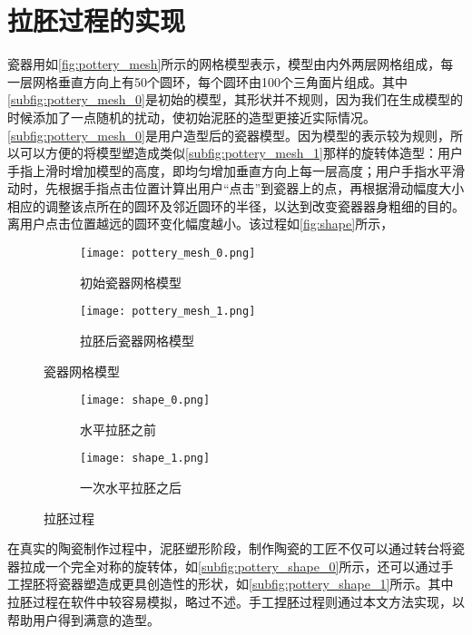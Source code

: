 \section{拉胚过程的实现}

瓷器用如\autoref{fig:pottery_mesh}所示的网格模型表示，模型由内外两层网格组成，每一层网格垂直方向上有50个圆环，每个圆环由100个三角面片组成。其中\autoref{subfig:pottery_mesh_0}是初始的模型，其形状并不规则，因为我们在生成模型的时候添加了一点随机的扰动，使初始泥胚的造型更接近实际情况。\autoref{subfig:pottery_mesh_0}是用户造型后的瓷器模型。因为模型的表示较为规则，所以可以方便的将模型塑造成类似\autoref{subfig:pottery_mesh_1}那样的旋转体造型：用户手指上滑时增加模型的高度，即均匀增加垂直方向上每一层高度；用户手指水平滑动时，先根据手指点击位置计算出用户“点击”到瓷器上的点，再根据滑动幅度大小相应的调整该点所在的圆环及邻近圆环的半径，以达到改变瓷器器身粗细的目的。离用户点击位置越远的圆环变化幅度越小。该过程如\autoref{fig:shape}所示，

\begin{figure}[htbp]
	\centering
	\begin{subfigure}[b]{.4\textwidth}
		\centering
	    \texttt{[image: pottery\_mesh\_0.png]}
		\caption{初始瓷器网格模型}\label{subfig:pottery_mesh_0}
	\end{subfigure}
	\begin{subfigure}[b]{.4\textwidth}
		\centering
		\texttt{[image: pottery\_mesh\_1.png]}
		\caption{拉胚后瓷器网格模型}\label{subfig:pottery_mesh_1}
	\end{subfigure}
	\caption{瓷器网格模型}\label{fig:pottery_mesh}
\end{figure}

\begin{figure}[htbp]
	\centering
	\begin{subfigure}[b]{.4\textwidth}
		\centering
	    \texttt{[image: shape\_0.png]}
		\caption{水平拉胚之前}\label{subfig:shape_0}
	\end{subfigure}
	\begin{subfigure}[b]{.4\textwidth}
		\centering
		\texttt{[image: shape\_1.png]}
		\caption{一次水平拉胚之后}\label{subfig:shape_1}
	\end{subfigure}
	\caption{拉胚过程}\label{fig:shape}
\end{figure}

在真实的陶瓷制作过程中，泥胚塑形阶段，制作陶瓷的工匠不仅可以通过转台将瓷器拉成一个完全对称的旋转体，如\autoref{subfig:pottery_shape_0}所示，还可以通过手工捏胚将瓷器塑造成更具创造性的形状，如\autoref{subfig:pottery_shape_1}所示。其中拉胚过程在软件中较容易模拟，略过不述。手工捏胚过程则通过本文方法实现，以帮助用户得到满意的造型。

